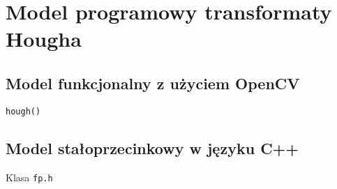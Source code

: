 \section{Model programowy transformaty Hougha}



\subsection{Model funkcjonalny z użyciem OpenCV}

\texttt{hough()}

%
%
%
%

%

\newpage
\subsection{Model stałoprzecinkowy w języku C++}

Klasa \texttt{fp.h}

